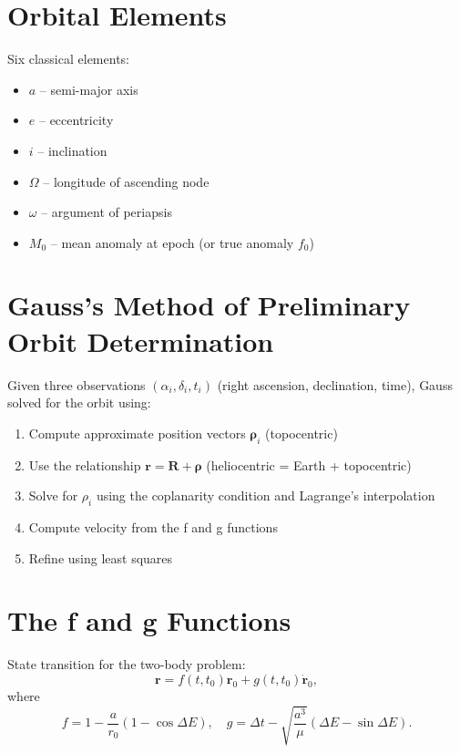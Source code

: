 \section{Orbital Elements }

Six classical elements:
\begin{itemize}
    \item $a$ -- semi-major axis
    \item $e$ -- eccentricity
    \item $i$ -- inclination
    \item $\Omega$ -- longitude of ascending node
    \item $\omega$ -- argument of periapsis
    \item $M_0$ -- mean anomaly at epoch (or true anomaly $f_0$)
\end{itemize}

\section{Gauss's Method of Preliminary Orbit Determination}

Given three observations $(\alpha_i, \delta_i, t_i)$ (right ascension, declination, time), Gauss solved for the orbit using:

\begin{enumerate}
    \item Compute approximate position vectors $\mathbf{\rho}_i$ (topocentric) 
    \item Use the relationship $\mathbf{r} = \mathbf{R} + \mathbf{\rho}$ (heliocentric = Earth + topocentric)
    \item Solve for $\rho_i$ using the coplanarity condition and Lagrange's interpolation 
    \item Compute velocity from the f and g functions 
    \item Refine using least squares 
\end{enumerate}

\section{The f and g Functions}

State transition for the two-body problem:
\[
\mathbf{r} = f(t, t_0) \mathbf{r}_0 + g(t, t_0) \dot{\mathbf{r}}_0,
\]
where
\[
f = 1 - \frac{a}{r_0}(1 - \cos \Delta E), \quad
g = \Delta t - \sqrt{\frac{a^3}{\mu}} (\Delta E - \sin \Delta E).
\]

